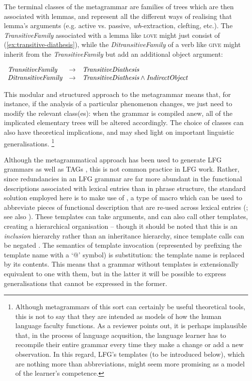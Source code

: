 \documentclass[output=paper,hidelinks]{langscibook}
\begin{document}
The terminal classes of the metagrammar are families of trees which are then
associated with lemmas, and represent all the different ways of realising that
lemma's arguments (e.g. active vs. passive, \textit{wh}-extraction, clefting,
etc.). The \textit{TransitiveFamily} associated with a lemma like \textsc{love}
might just consist of (\ref{ex:transitive-diathesis}), while the
\textit{DitransitiveFamily} of a verb like \textsc{give} might inherit from the
\textit{TransitiveFamily} but add an additional object argument:

\ea
$
\begin{array}[t]{lcl}
  \textit{TransitiveFamily} & \rightarrow & \textit{TransitiveDiathesis}\\
  \textit{DitransitiveFamily} & \rightarrow & \textit{TransitiveDiathesis} \land
                                              \textit{IndirectObject}
\end{array}
$
\z

\noindent This modular and structured approach to the metagrammar means that,
for instance, if the analysis of a particular phenomenon changes, we just need
to modify the relevant class(es): when the grammar is compiled anew, all of the
implicated elementary trees will be altered accordingly. The choice of classes
can also have theoretical implications, and may shed light on important
linguistic generalisations.%
%
\footnote{Although metagrammars of this sort can certainly be useful theoretical
  tools, this is not to say that they are intended as models of how the human
  language faculty functions. As a reviewer points out, it is perhaps
  implausible that, in the process of language acqusition, the language learner
  has to recompile their entire grammar every time they make a change or add a
  new observation. In this regard, LFG's templates (to be introduced below),
  which are nothing more than abbreviations, might seem more promising as a
  model of the learner's competence.}
%

Although the metagrammatical approach has been used to generate LFG grammars as
well as TAGs \citep{clement:lfg-metagrammar,clement:lfg-tag-metagrammar}, this
is not common practice in LFG work. Rather, since redundancies in an LFG grammar
are far more abundant in the functional descriptions associated with lexical
entries than in phrase structure, the standard solution employed here is to make
use of , a type of macro which can be used to abbreviate pieces of
functional description that are re-used across lexical entries
(\citealp{dalrymple2004linguistic,xledoc}; see also
). These templates can take arguments, and can also
call other templates, creating a hierarchical organisation -- though it should
be noted that this is an \emph{inclusion} hierarchy rather than an inheritance
hierarchy, since template calls can be negated
\citep[18f.]{asudeh2013constructions}. The semantics of template invocation
(represented by prefixing the template name with a `@' symbol) is substitution:
the template name is replaced by its contents. This means that a grammar without
templates is extensionally equivalent to one with them, but in the latter it
will be possible to express generalisations that cannot be expressed in the
former.
\end{document}
